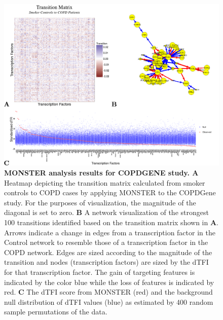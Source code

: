 \begin{figure}
\includegraphics[width=1\linewidth]{figures/figure2COPDGene}
\caption{\textbf{MONSTER analysis results for COPDGENE study. A } Heatmap depicting the transition matrix calculated from smoker controls to COPD cases by applying MONSTER to the COPDGene study. For the purposes of visualization, the magnitude of the diagonal is set to zero. \textbf{B} A network visualization of the strongest 100 transitions identified based on the transition matrix shown in \textbf{A}. Arrows indicate a change in edges from a transcription factor in the Control network to resemble those of a transcription factor in the COPD network. Edges are sized according to the magnitude of the transition and nodes (transcription factors) are sized by the dTFI for that transcription factor. The gain of targeting features is indicated by the color blue while the loss of features is indicated by red. \textbf{C} The dTFI score from MONSTER (red) and the background null distribution of dTFI values (blue) as estimated by 400 random sample permutations of the data.}
\label{fig:figure2COPDGene}
\end{figure}

